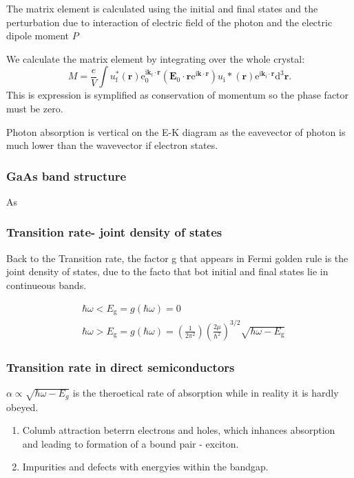 \documentclass[12pt,a4paper]{article}
\begin{document}
The matrix element is calculated using the initial and final states and the perturbation due to interaction of electric field of the photon and the electric dipole moment $P$

We calculate the matrix element by integrating over the whole crystal:
$$
M=\frac{e}{V} \int u_{\mathrm{f}}^*(\boldsymbol{r}) \mathrm{e}_0^{\mathrm{i} \boldsymbol{k}_{\mathrm{f}} \cdot \boldsymbol{r}}\left(\boldsymbol{E}_0 \cdot \boldsymbol{r} \mathrm{e}^{\mathrm{i} \boldsymbol{k} \cdot \boldsymbol{r}}\right) u_{\mathrm{i}} *(\boldsymbol{r}) \mathrm{e}^{\mathrm{i} \boldsymbol{k}_{\mathrm{i}} \cdot \boldsymbol{r}} \mathrm{d}^3 \boldsymbol{r} .
$$
This is expression is symplified as conservation of momentum so the phase factor must be zero.

Photon absorption is vertical on the E-K diagram as the eavevector of photon is much lower than the wavevector if electron states.
\subsubsection{GaAs band structure}
As
\subsubsection{Transition rate- joint density of states}
Back to the Transition rate, the factor g that appears in Fermi golden rule is the joint density of states, due to the facto that bot initial and final states lie in continueous bands. 

$$
\begin{aligned} 
    & \hbar \omega<E_{\mathrm{g}}=g(\hbar \omega)=0 \\ & \hbar \omega>E_{\mathrm{g}}=g(\hbar \omega)=\left(\frac{1}{2 \pi^2}\right)\left(\frac{2 \mu}{\hbar^2}\right)^{3 / 2} \sqrt{\hbar \omega-E_{\mathrm{g}}}
\end{aligned}
$$
\subsubsection{Transition rate in direct semiconductors}
$\alpha \propto \sqrt{\hbar \omega-E_g}$ is the theroetical rate of absorption while in reality it is hardly obeyed.
\begin{enumerate}
    \item Columb attraction beterrn electrons and holes, which inhances absorption and leading to formation of a bound pair - exciton.
    \item Impurities and defects with energyies within the bandgap.
\end{enumerate}
\end{document}
